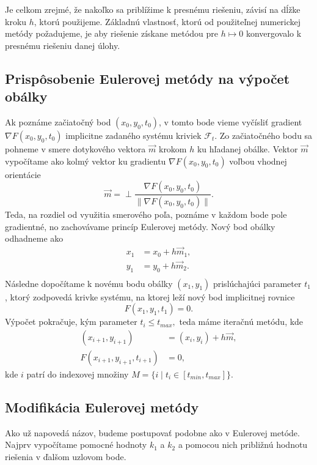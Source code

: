 Je celkom zrejmé, že nakoľko sa priblížime k presnému riešeniu, závisí na dĺžke kroku $h$, ktorú použijeme. Základnú vlastnosť, ktorú od použiteľnej numerickej metódy požadujeme, je aby riešenie získane metódou pre $h \mapsto 0$ konvergovalo k presnému riešeniu danej úlohy.
 
\subsection{Prispôsobenie Eulerovej metódy na výpočet obálky}
Ak poznáme začiatočný bod $(x_0,y_0,t_0)$, v tomto bode vieme vyčísliť gradient $\nabla F(x_0, y_0, t_0)$ implicitne zadaného systému kriviek $\mathcal{F}_t$. Zo začiatočného bodu sa pohneme v smere dotykového vektora $\vec{m}$ krokom $h$ ku hľadanej obálke. Vektor $\vec{m}$ vypočítame ako kolmý vektor ku gradientu $\nabla F(x_0, y_0, t_0)$ voľbou vhodnej orientácie  
$$\vec{m} = \perp \dfrac{\nabla F(x_0, y_0, t_0)}{\| \nabla F(x_0, y_0, t_0)\|}.$$ 
Teda, na rozdiel od využitia smerového poľa, poznáme v každom bode pole gradientné, no zachovávame princíp Eulerovej metódy. Nový bod obálky odhadneme ako
\begin{align*}
x_1 &= x_0 + h \vec{m}_{1}, \\
y_1 &= y_0 + h \vec{m}_{2}. \\
\end{align*} 
Následne dopočítame k novému bodu obálky $(x_1, y_1)$ prislúchajúci parameter $t_1$, ktorý zodpovedá krivke systému, na ktorej leží nový bod implicitnej rovnice $$F(x_1, y_1, t_1) = 0.$$
Výpočet pokračuje, kým parameter $t_i \leq t_{max},$ teda máme iteračnú metódu, kde
\begin{align*}
(x_{i+1}, y_{i+1}) &= (x_i, y_i)+ h \vec{m}, \\
F(x_{i+1}, y_{i+1}, t_{i+1}) &= 0,
\end{align*} 
kde $i$ patrí do indexovej množiny $M = \{ i \mid t_{i} \in [t_{min},t_{max}] \}.$

\subsection{Modifikácia Eulerovej metódy}
Ako už napovedá názov, budeme postupovať podobne ako v Eulerovej metóde. Najprv vypočítame pomocné hodnoty \(k_1\) a \(k_2\) a pomocou nich približnú hodnotu riešenia v ďalšom uzlovom bode.


